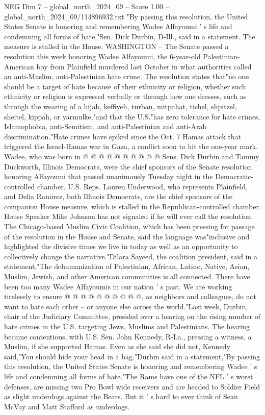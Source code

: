\begin{textsample}{NEG Dim 7 – global\_north\_2024\_09 – Score 1.00 – global\_north\_2024\_09/114896932.txt}  \label{ex:f7_neg_383}
"By passing this resolution, the United States Senate is honoring and remembering Wadee Alfayoumi ' s life and condemning all forms of hate,"Sen.
Dick Durbin, D-Ill., said in a statement.
The measure is stalled in the House.
WASHINGTON -- The Senate passed a resolution this week honoring Wadee Alfayoumi, the 6-year-old Palestinian-American boy from Plainfield murdered last October in what authorities called an anti-Muslim, anti-Palestinian hate crime.
The resolution states that"no one should be a target of hate because of their ethnicity or religion, whether such ethnicity or religion is expressed verbally or through how one dresses, such as through the wearing of a hijab, keffiyeh, turban, mitpahat, tichel, shpitzel, sheitel, kippah, or yarmulke,"and that the U.S."has zero tolerance for hate crimes, Islamophobia, anti-Semitism, and anti-Palestinian and anti-Arab discrimination."Hate crimes have spiked since the Oct. 7 Hamas attack that triggered the Israel-Hamas war in Gaza, a conflict soon to hit the one-year mark.
Wadee, who was born in @ @ @ @ @ @ @ @ @ @ Sens.
Dick Durbin and Tammy Duckworth, Illinois Democrats, were the chief sponsors of the Senate resolution honoring Alfayoumi that passed unanimously Tuesday night in the Democratic-controlled chamber.
U.S.
Reps.
Lauren Underwood, who represents Plainfield, and Delia Ramirez, both Illinois Democrats, are the chief sponsors of the companion House measure, which is stalled in the Republican-controlled chamber.
House Speaker Mike Johnson has not signaled if he will ever call the resolution.
The Chicago-based Muslim Civic Coalition, which has been pressing for passage of the resolution in the House and Senate, said the language was"inclusive and highlighted the divisive times we live in today as well as an opportunity to collectively change the narrative."Dilara Sayeed, the coalition president, said in a statement,"The dehumanization of Palestinian, African, Latino, Native, Asian, Muslim, Jewish, and other American communities is all connected.
There have been too many Wadee Alfayoumis in our nation ' s past.
We are working tirelessly to ensure @ @ @ @ @ @ @ @ @ @, as neighbors and colleagues, do not want to hate each other -- or anyone else across the world."Last week, Durbin, chair of the Judiciary Committee, presided over a hearing on the rising number of hate crimes in the U.S. targeting Jews, Muslims and Palestinians.
The hearing became contentious, with U.S.
Sen.
John Kennedy, R-La., pressing a witness, a Muslim, if she supported Hamas.
Even as she said she did not, Kennedy said,"You should hide your head in a bag."Durbin said in a statement,"By passing this resolution, the United States Senate is honoring and remembering Wadee ' s life and condemning all forms of hate."The Rams have one of the NFL ' s worst defenses, are missing two Pro Bowl wide receivers and are headed to Soldier Field as slight underdogs against the Bears.
But it ' s hard to ever think of Sean McVay and Matt Stafford as underdogs.

\end{textsample}
